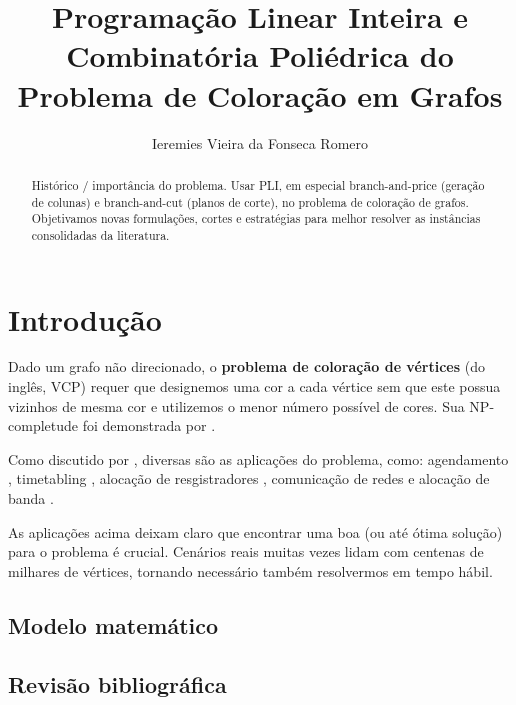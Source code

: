 \documentclass[11pt]{article}
\author{Ieremies Vieira da Fonseca Romero}
\date{}
\title{Programação Linear Inteira e Combinatória Poliédrica do Problema de Coloração em Grafos}
\begin{document}
\maketitle
\begin{abstract}
Histórico / importância do problema.
Usar PLI, em especial branch-and-price (geração de colunas) e branch-and-cut (planos de corte), no problema de coloração de grafos.
Objetivamos novas formulações, cortes e estratégias para melhor resolver as instâncias consolidadas da literatura.
\end{abstract}

\section{Introdução}
\label{sec:orga0b94aa}
Dado um grafo não direcionado, o \textbf{problema de coloração de vértices} (do inglês, VCP) requer que designemos uma cor a cada vértice sem que este possua vizinhos de mesma cor e utilizemos o menor número possível de cores.
Sua NP-completude foi demonstrada por \textcite{Garey1979ComputersIntractabilityGuide}.

Como discutido por \autocite{Malaguti2010SurveyVertexColoring}, diversas são as aplicações do problema, como: agendamento \autocite{Leighton1979GraphColoringAlgorithm}, timetabling \autocite{Werra1985introductiontimetabling}, alocação de resgistradores \autocite{Chow1990prioritybasedcoloring}, comunicação de redes \autocite{Caprara2007PassengerRailwayOptimization} e alocação de banda \autocite{Gamst1986Somelowerbounds}.

As aplicações acima deixam claro que encontrar uma boa (ou até ótima solução) para o problema é crucial. Cenários reais muitas vezes lidam com centenas de milhares de vértices, tornando necessário também resolvermos em tempo hábil. 

\subsection{Modelo matemático}
\label{sec:orgf777b64}
\subsection{Revisão bibliográfica}
\label{sec:orgffadaa6}
\end{document}
